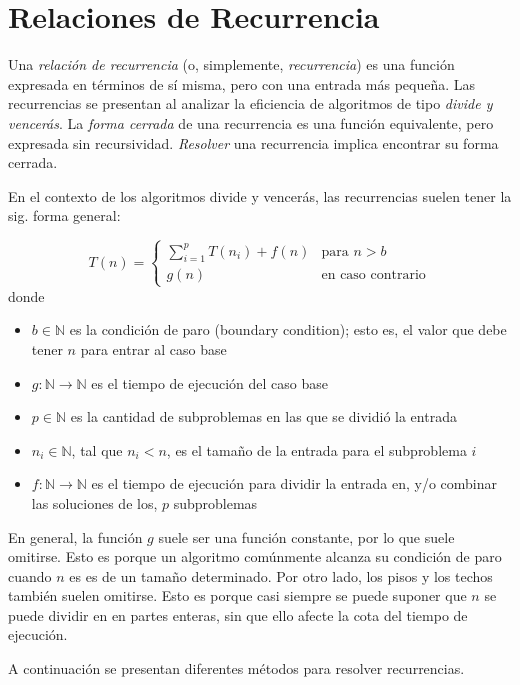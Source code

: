 \chapter{Relaciones de Recurrencia}

Una \emph{relación de recurrencia} (o, simplemente, \emph{recurrencia})
es una función expresada en términos de sí misma, pero con una entrada
más pequeña. Las recurrencias se presentan al analizar la
eficiencia de algoritmos de tipo \emph{divide y vencerás}. La \emph{forma
cerrada} de una recurrencia es una función equivalente, pero expresada
sin recursividad. \emph{Resolver} una recurrencia implica encontrar
su forma cerrada.

En el contexto de los algoritmos divide y vencerás, las recurrencias
suelen tener la sig. forma general: 

\[
    T(n)=\begin{cases}
        \sum_{i=1}^{p}T(n_{i})+f(n) & \text{para }n>b\\
        g(n) & \text{en caso contrario}
    \end{cases}
\]
donde

\begin{itemize}
    \item $b\in\mathbb{N}$ es la condición de paro (boundary condition); esto
    es, el valor que debe tener $n$ para entrar al caso base
    \item $g:\mathbb{N}\to\mathbb{N}$ es el tiempo de ejecución del caso base
    \item $p\in\mathbb{N}$ es la cantidad de subproblemas en las que se dividió
    la entrada
    \item $n_{i}\in\mathbb{N}$, tal que $n_{i}<n$, es el tamaño de la entrada
    para el subproblema $i$ 
    \item $f:\mathbb{N}\to\mathbb{N}$ es el tiempo de ejecución para dividir
    la entrada en, y/o combinar las soluciones de los, $p$ subproblemas
\end{itemize}

En general, la función $g$ suele ser una función constante, por lo que suele omitirse. 
Esto es porque un algoritmo comúnmente alcanza su condición de paro cuando $n$ es 
es de un tamaño determinado. Por otro lado, los pisos y los techos también suelen 
omitirse. Esto es porque casi siempre se puede suponer que $n$ se puede dividir en 
en partes enteras, sin que ello afecte la cota del tiempo de ejecución.

A continuación se presentan diferentes métodos para resolver recurrencias.

